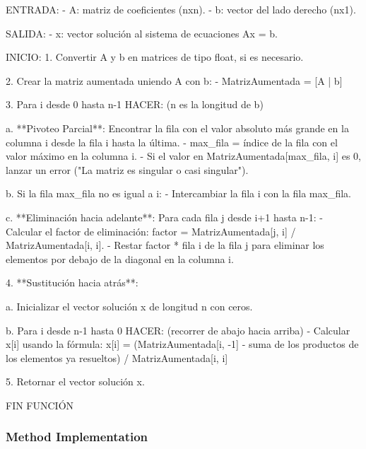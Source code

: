 \documentclass{article}
\begin{document}
    ENTRADA:
    - A: matriz de coeficientes (nxn).
    - b: vector del lado derecho (nx1).

    SALIDA:
    - x: vector solución al sistema de ecuaciones Ax = b.

    INICIO:
    1. Convertir A y b en matrices de tipo float, si es necesario.

    2. Crear la matriz aumentada uniendo A con b:
       - MatrizAumentada = [A | b]

    3. Para i desde 0 hasta n-1 HACER:  (n es la longitud de b)

        a. **Pivoteo Parcial**: Encontrar la fila con el valor absoluto más grande en la columna i desde la fila i hasta la última.
           - max_fila = índice de la fila con el valor máximo en la columna i.
           - Si el valor en MatrizAumentada[max_fila, i] es 0, lanzar un error ("La matriz es singular o casi singular").

        b. Si la fila max_fila no es igual a i:
           - Intercambiar la fila i con la fila max_fila.

        c. **Eliminación hacia adelante**: Para cada fila j desde i+1 hasta n-1:
            - Calcular el factor de eliminación: factor = MatrizAumentada[j, i] / MatrizAumentada[i, i].
            - Restar factor * fila i de la fila j para eliminar los elementos por debajo de la diagonal en la columna i.

    4. **Sustitución hacia atrás**:

        a. Inicializar el vector solución x de longitud n con ceros.

        b. Para i desde n-1 hasta 0 HACER: (recorrer de abajo hacia arriba)
           - Calcular x[i] usando la fórmula:
             x[i] = (MatrizAumentada[i, -1] - suma de los productos de los elementos ya resueltos) / MatrizAumentada[i, i]

    5. Retornar el vector solución x.

FIN FUNCIÓN

        \subsubsection{Method Implementation}
\end{document}
